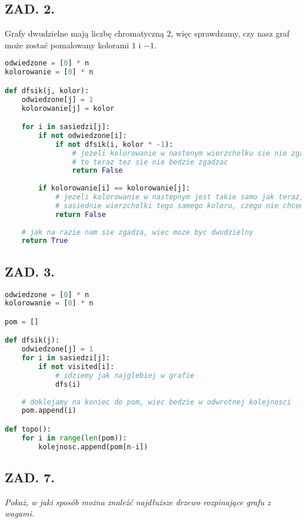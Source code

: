 \documentclass{article}
\begin{document}
\subsection*{ZAD. 2.}

Grafy dwudzielne mają liczbę chromatyczną $2$, więc sprawdzamy, czy nasz graf może zostać pomalowany kolorami $1$ i $-1$.

\begin{lstlisting}[language=Python]
odwiedzone = [0] * n
kolorowanie = [0] * n

def dfsik(j, kolor):
    odwiedzone[j] = 1
    kolorowanie[j] = kolor

    for i in sasiedzi[j]:
        if not odwiedzone[i]:
            if not dfsik(i, kolor * -1): 
                # jezeli kolorowanie w nastenym wierzcholku sie nie zgadza, 
                # to teraz tez sie nie bedzie zgadzac
                return False
            
        if kolorowanie[i] == kolorowanie[j]:
            # jezeli kolorowanie w nastepnym jest takie samo jak teraz, to mamy 
            # sasiednie wierzcholki tego samego koloru, czego nie chcemy
            return False
    
    # jak na razie nam sie zgadza, wiec moze byc dwudzielny
    return True

\end{lstlisting}

\subsection*{ZAD. 3.}
\begin{lstlisting}[language=Python]
odwiedzone = [0] * n
kolorowanie = [0] * n

pom = []

def dfsik(j):
    odwiedzone[j] = 1
    for i in sasiedzi[j]:
        if not visited[i]:
            # idziemy jak najglebiej w grafie
            dfs(i)
    
    # doklejamy na koniec do pom, wiec bedzie w odwrotnej kolejnosci
    pom.append(i)

def topo():
    for i in range(len(pom)):
        kolejnosc.append(pom[n-i])
\end{lstlisting}

\subsection*{ZAD. 7.}
\emph{Pokaż, w jaki sposób można znaleźć najdłuższe drzewo rozpinające grafu z wagami.}
\medskip
\end{document}
